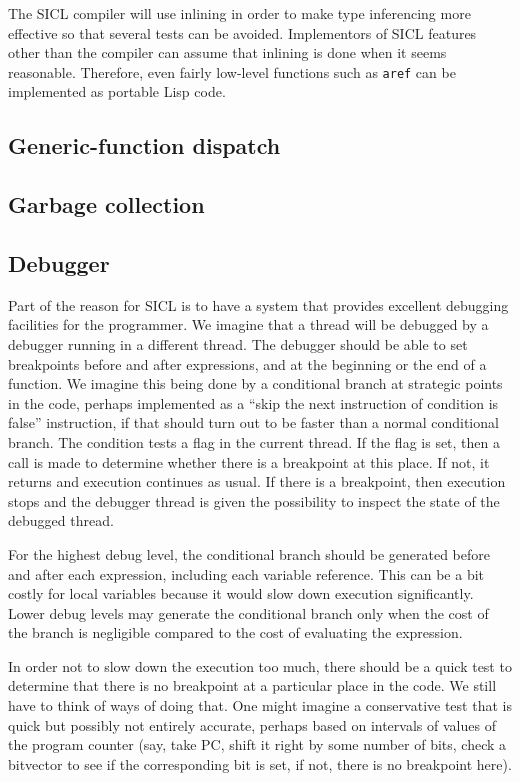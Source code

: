 \documentclass{article}
\begin{document}
The SICL compiler will use inlining in order to make type inferencing
more effective so that several tests can be avoided.  Implementors of
SICL features other than the compiler can assume that inlining is done
when it seems reasonable.  Therefore, even fairly low-level functions
such as \texttt{aref} can be implemented as portable Lisp code. 

\subsection{Generic-function dispatch}

\subsection{Garbage collection}

\subsection{Debugger}
\label{section-debugging}

Part of the reason for SICL is to have a system that provides
excellent debugging facilities for the programmer.  We imagine that a
thread will be debugged by a debugger running in a different thread.
The debugger should be able to set breakpoints before and after
expressions, and at the beginning or the end of a function.  
We imagine this being done by a conditional branch at strategic points
in the code, perhaps implemented as a ``skip the next instruction of
condition is false'' instruction, if that should turn out to be faster
than a normal conditional branch.  The condition tests a flag in the
current thread.  If the flag is set, then a call is made to determine
whether there is a breakpoint at this place.  If not, it returns and
execution continues as usual.  If there is a breakpoint, then
execution stops and the debugger thread is given the possibility to
inspect the state of the debugged thread. 

For the highest debug level, the conditional branch should be
generated before and after each expression, including each variable
reference.  This can be a bit costly for local variables because it
would slow down execution significantly.  Lower debug levels may
generate the conditional branch only when the cost of the branch is
negligible compared to the cost of evaluating the expression. 

In order not to slow down the execution too much, there should be a
quick test to determine that there is no breakpoint at a particular
place in the code.  We still have to think of ways of doing that.  One
might imagine a conservative test that is quick but possibly not
entirely accurate, perhaps based on intervals of values of the program
counter (say, take PC, shift it right by some number of bits, check a
bitvector to see if the corresponding bit is set, if not, there is no
breakpoint here). 
\end{document}
